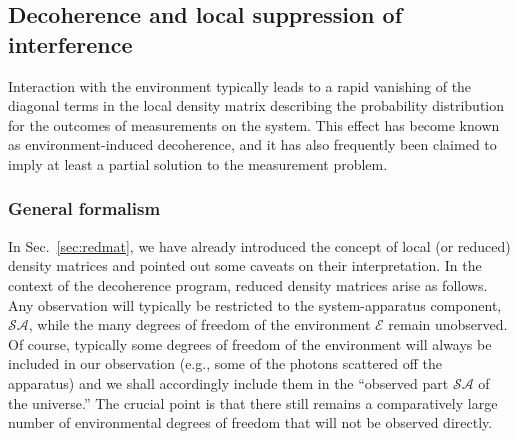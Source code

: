 \documentclass[twocolumn,rmp,aps,amsmath,amsfonts,noshowkeys,noshowpacs]{revtex4}
\begin{document}
\subsection{Decoherence and local suppression of interference \label{sec:interf}}

Interaction with the environment typically leads to a rapid vanishing
of the diagonal terms in the local density matrix describing the
probability distribution for the outcomes of measurements on the
system. This effect has become known as environment-induced
decoherence, and it has also frequently been claimed to imply at
least a partial solution to the measurement problem.

\subsubsection{General formalism}

In Sec.~\ref{sec:redmat}, we have already introduced the concept of
local (or reduced) density matrices and pointed out some caveats on
their interpretation.  In the context of the decoherence program,
reduced density matrices arise as follows. Any observation will
typically be restricted to the system-apparatus component,
$\mathcal{SA}$, while the many degrees of freedom of the environment
$\mathcal{E}$ remain unobserved. Of course, typically some degrees of
freedom of the environment will always be included in our observation
(e.g., some of the photons scattered off the apparatus) and we shall
accordingly include them in the ``observed part $\mathcal{SA}$ of the
universe.''  The crucial point is that there still remains a
comparatively large number of environmental degrees of freedom that will
not be observed directly.
\end{document}
